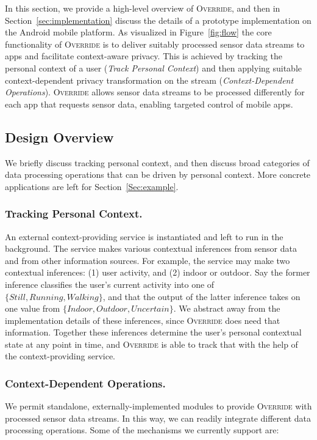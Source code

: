 \documentclass[10pt]{sensys-proc}
\begin{document}
In this section, we provide a high-level overview of \textsc{Override}, and then in Section~\ref{sec:implementation} discuss the details of a prototype implementation on the Android mobile platform. As visualized in Figure~\ref{fig:flow} the core functionality of \textsc{Override} is to deliver suitably processed sensor data streams to apps and facilitate context-aware privacy. This is achieved by tracking the personal context of a user (\emph{Track Personal Context}) and then applying suitable context-dependent privacy transformation on the stream (\emph{Context-Dependent Operations}). \textsc{Override} allows sensor data streams to be processed differently for each app that requests sensor data, enabling targeted control of mobile apps.

\subsection{Design Overview}

We briefly discuss tracking personal context, and then discuss broad categories of data processing operations that can be driven by personal context. More concrete applications are left for Section~\ref{Sec:example}.

\subsubsection{Tracking Personal Context.}

An external context-providing service is instantiated and left to run in the background. The service makes various contextual inferences from sensor data and from other information sources. For example, the service may make two contextual inferences: (1) user activity, and (2) indoor or outdoor. Say the former inference classifies the user's current activity into one of $\{Still, Running, Walking\}$, and that the output of the latter inference takes on one value from $\{Indoor, Outdoor, Uncertain\}$. We abstract away from the implementation details of these inferences, since \textsc{Override} does need that information. Together these inferences determine the user's personal contextual state at any point in time, and \textsc{Override} is able to track that with the help of the context-providing service.

\subsubsection{Context-Dependent Operations.}
We permit standalone, externally-implemented modules to provide \textsc{Override} with processed sensor data streams. In this way, we can readily integrate different data processing operations. Some of the mechanisms we currently support are:
\end{document}
